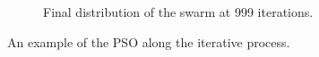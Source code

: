 \begin{figure}[hbp]
\begin{subfigure}[b]{0.5\textwidth}
    \caption{Final distribution of the swarm at 999 iterations.}
    \label{fig:f6}
  \end{subfigure}
  \caption{An example of the PSO along the iterative process.}
  \label{fig:fplots}
\end{figure}






